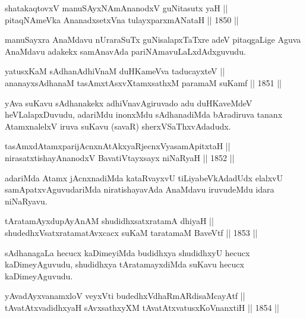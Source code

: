 \begin{shl}
shatakaqtovxV manuSAyxNAmAnanodxV guNitasutx yaH || \\
pitaqNAmeVka AnanadxsetxVna tulayxparxmANataH \hfill || 1850 ||  
\end{shl}

\begin{artha}
manuSayxra AnaMdavu nUraraSuTx guNisalapxTaTxre adeV pitaqgaLige Aguva
AnaMdavu adakekx samAnavAda pariNAmavuLaLxdAdxguvudu.
\end{artha}

\begin{shl}
yatusxKaM sAdhanAdhiVnaM duHKameVva taducayxteV ||  \\
ananayxsAdhanaM tasAmxtAsxvXtamxsathxM paramaM suKamf \hfill || 1851 ||  
\end{shl}	

\begin{artha}
yAva suKavu sAdhanakekx adhiVnavAgiruvado adu duHKaveMdeV
heVLalapxDuvudu, adariMdu inonxMdu sAdhanadiMda bAradiruva tananx
AtamxnalelxV iruva suKavu (savaR) sherxVSaThxvAdadudx.
\end{artha}

\begin{shl}
tasAmxdAtamxparijAcnxnAtAkxyaRjecnxVyasamApitxtaH || \\
nirasatxtishayAnanodxV BavatiVtayxsayx niNaRyaH \hfill || 1852 ||  
\end{shl}

\begin{artha}
adariMda Atamx jAcnxnadiMda kataRvayxvU tiLiyabeVkAdadUdx elalxvU
samApatxvAguvudariMda niratishayavAda AnaMdavu iruvudeMdu idara
niNaRyavu.
\end{artha}

\begin{shl}
tAratamAyxdupAyAnAM shudidhxsatxratamA dhiyaH || \\
shudedhxVsatxratamatAvxcacx suKaM taratamaM BaveVtf \hfill || 1853 ||  
\end{shl}

\begin{artha}
sAdhanagaLa hecucx kaDimeyiMda budidhxya shudidhxyU hecucx
kaDimeyAguvudu, shudidhxya tAratamayxdiMda suKavu hecucx
kaDimeyAguvudu.
\end{artha}

\begin{shl}
yAvadAyxvanamxloV veyxVti budedhxVdhaRmARdisaMcayAtf || \\
tAvatAtxvadidhxyaH sAvxsathxyXM tAvatAtxvatusxKoVnanxtiH \hfill || 1854 || 
\end{shl}

